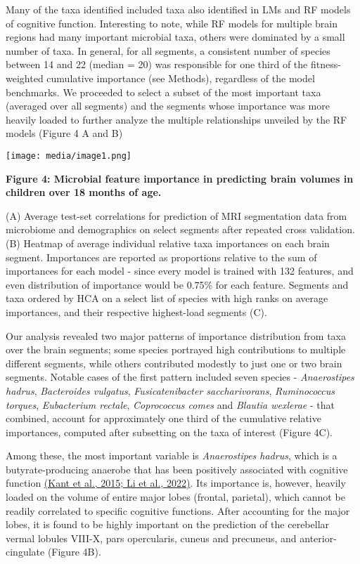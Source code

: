 Many of the taxa identified included taxa also identified in LMs and RF
models of cognitive function. Interesting to note, while RF models for
multiple brain regions had many important microbial taxa, others were
dominated by a small number of taxa. In general, for all segments, a
consistent number of species between 14 and 22 (median = 20) was
responsible for one third of the fitness-weighted cumulative importance
(see Methods), regardless of the model benchmarks. We proceeded to
select a subset of the most important taxa (averaged over all segments)
and the segments whose importance was more heavily loaded to further
analyze the multiple relationships unveiled by the RF models
(Figure 4 A and B)

\texttt{[image: media/image1.png]}

\textbf{Figure 4: Microbial feature importance in predicting brain
volumes in children over 18 months of age.}

(A) Average test-set correlations for prediction of MRI segmentation
data from microbiome and demographics on select segments after repeated
cross validation. (B) Heatmap of average individual relative taxa
importances on each brain segment. Importances are reported as
proportions relative to the sum of importances for each model - since
every model is trained with 132 features, and even distribution of
importance would be 0.75\% for each feature. Segments and taxa ordered
by HCA on a select list of species with high ranks on average importances,
and their respective highest-load segments (C).

Our analysis revealed two major patterns of importance distribution from
taxa over the brain segments; some species portrayed high contributions
to multiple different segments, while others contributed modestly to
just one or two brain segments. Notable cases of the first pattern
included seven species - \emph{Anaerostipes hadrus}, \emph{Bacteroides
vulgatus}, \emph{Fusicatenibacter saccharivorans}, \emph{Ruminococcus
torques}, \emph{Eubacterium rectale}, \emph{Coprococcus comes} and
\emph{Blautia wexlerae} - that combined, account for approximately one
third of the cumulative relative importances, computed after subsetting
on the taxa of interest (Figure 4C).

Among these, the most important variable is \emph{Anaerostipes hadrus},
which is a butyrate-producing anaerobe that has been positively
associated with cognitive function
\href{https://www.zotero.org/google-docs/?AVJiwu}{(Kant et al., 2015; Li
et al., 2022)}. Its importance is, however, heavily loaded on the volume
of entire major lobes (frontal, parietal), which cannot be readily
correlated to specific cognitive functions. After accounting for the
major lobes, it is found to be highly important on the prediction of the
cerebellar vermal lobules VIII-X, pars opercularis, cuneus and
precuneus, and anterior-cingulate (Figure 4B).


